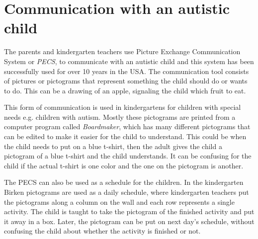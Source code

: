 \section{Communication with an autistic child}
The parents and kindergarten teachers use Picture Exchange Communication System or \emph{PECS}, to communicate with an autistic child and this system has been successfully used for over 10 years in the USA\cite{centerAutism}. The communication tool consists of pictures or pictograms that represent something the child should do or wants to do. This can be a drawing of an apple, signaling the child which fruit to eat. 

This form of communication is used in kindergartens for children with special needs e.g. children with autism. Mostly these pictograms are printed from a computer program called \emph{Boardmaker}, which has many different pictograms that can be edited to make it easier for the child to understand\cite{centerAutism}. This could be when the child needs to put on a blue t-shirt, then the adult gives the child a pictogram of a blue t-shirt and the child understands. It can be confusing for the child if the actual t-shirt is one color and the one on the pictogram is another.

The PECS can also be used as a schedule for the children. In the kindergarten Birken pictograms are used as a daily schedule, where kindergarten teachers put the pictograms along a column on the wall and each row represents a single activity.
The child is taught to take the pictogram of the finished activity and put it away in a box. Later, the pictogram can be put on next day's schedule, without confusing the child about whether the activity is finished or not.
